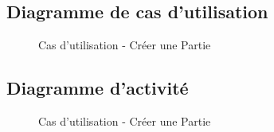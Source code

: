 \documentclass[a4paper,11pt]{article}
\begin{document}
\subsection{Diagramme de cas d'utilisation}
\begin{figure}[h!]
\caption{Cas d'utilisation - Créer une Partie}
\end{figure}
\newpage
\subsection{Diagramme d'activité}
\begin{figure}[ht!]
\caption{Cas d'utilisation - Créer une Partie}
\end{figure}
\newpage
\end{document}
